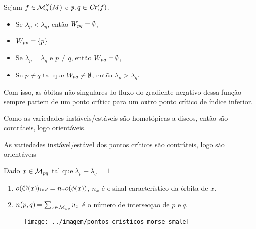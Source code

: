 \documentclass{beamer}
\begin{document}
	\begin{frame}
		\begin{proposicao}
			Sejam $f \in \mathcal{M}^{S}_{o}(M)$ e $p,q \in \textit{Cr}(f)$.
			\begin{itemize}
				\item Se $\lambda_{p}<\lambda_{q}$, então $W_{pq} = \emptyset$,
				
				\item $W_{pp} = \{p\}$
				
				\item Se $\lambda_{p} = \lambda_{q}$ e $p\neq q$, então $W_{pq} = \emptyset$,
				
				\item Se $p \neq q$ tal que $W_{pq} \neq \emptyset$, então $\lambda_{p}>\lambda_{q}$.
			\end{itemize}
		\end{proposicao}
		
		Com isso, as óbitas não-singulares do fluxo do gradiente negativo dessa função sempre partem de um ponto crítico para um outro ponto crítico de índice inferior.

		\begin{tiny}
			Como as variedades instáveis/estáveis são homotópicas a discos, então são contráteis, logo orientáveis.
		\end{tiny}		
	\end{frame}
	
	\begin{frame}
		
		As variedades instável/estável dos pontos críticos são contráteis, logo são orientáveis.
		
		\begin{definicao}
			Dado $x \in \mathcal{M}_{pq}$ tal que $\lambda_{p}-\lambda_{q} = 1$
			
			\begin{enumerate}
				\item $o(\mathcal{O}(x))_{ind} = n_{x}o(\phi(x))$, $n_{x}$ é o sinal característico da órbita de $x$.
				
				\item $n(p,q) = \sum_{x \in \mathcal{M}_{pq} }n_{x}$ é o número de intersecçao de $p$ e $q$.
			\end{enumerate}
			
		\end{definicao}
		\begin{figure}
			\centering
			\textbf{}\par
			\texttt{[image: ../imagem/pontos\_cristicos\_morse\_smale]}
		\end{figure}
	\end{frame}
	
\end{document}
